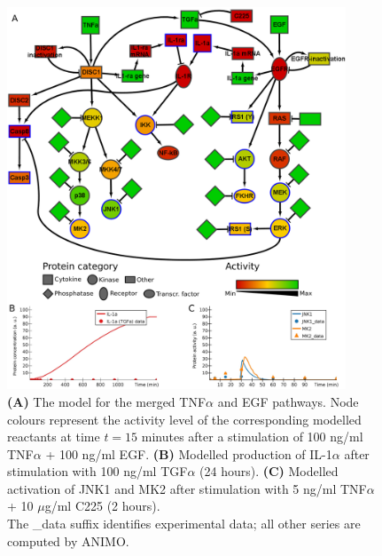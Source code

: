 \documentclass{bmcart}
\begin{document}
\def\largeModelScale{0.18}%
\def\legendScalaColori{0.21}%
\def\legendScalaForme{0.21}%
\def\scalaGrafici{0.0709}%
\begin{figure}[!htpb]
\centering
  \includegraphics[width=0.9\textwidth]{Figures/4}
\caption{
{\bf(A)} %
The model for the merged TNF$\alpha$ and EGF pathways. Node colours represent the
activity level of the corresponding modelled reactants at time $t = 15$ minutes after
a stimulation of 100 ng/ml TNF$\alpha$ + 100 ng/ml EGF.
{\bf(B)} %
Modelled production of IL-1$\alpha$ after stimulation with 100 ng/ml TGF$\alpha$ (24 hours).
{\bf(C)} %
Modelled activation of JNK1 and MK2 after stimulation with 5 ng/ml TNF$\alpha$ + 10 $\mu$g/ml C225 (2 hours).
\\
The {\sf \_{}data} suffix identifies experimental data; all other series are computed by ANIMO.}\label{fig:large-model-all}
\end{figure}
\end{document}
